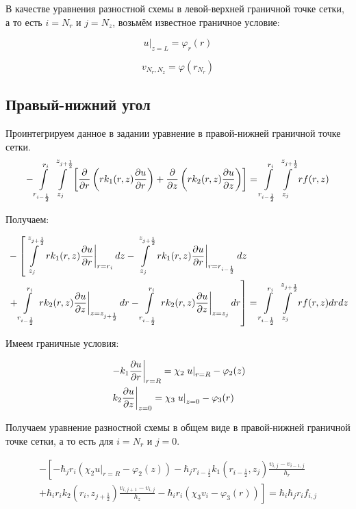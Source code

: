 В качестве уравнения разностной схемы в левой-верхней граничной точке сетки, 
а то есть $ i = N_r $ и $ j = N_z $, возьмём известное граничное условие:

\[
  \left . u \right \vert_{z=L} = \varphi_r(r) 
\]

\[
  v_{N_r,N_z} = \varphi(r_{N_r})
\]

\subsection{Правый-нижний угол}

Проинтегрируем данное в задании уравнение в правой-нижней граничной точке сетки.
\[
  - \int\limits^{r_{i }}_{r_{i -\frac{1}{2}}} \int\limits^{z_{j +\frac{1}{2}}}_{z_{j }} \left [ \pdv{}{r} \left ( r k_1(r, z) \pdv{u}{r} \right ) 
  + \pdv{}{z} \left ( rk_2(r, z)\pdv{u}{z} \right ) \right ] = \int\limits^{r_{i }}_{r_{i -\frac{1}{2}}} \int\limits^{z_{j +\frac{1}{2}}}_{z_{j }} rf(r, z)
\]

Получаем:

\begin{align*}
  &- \left [
   \int\limits^{z_{j +\frac{1}{2}}}_{z_{j }}  \left . r k_1(r, z) \pdv{u}{r} \right \vert_{r = r_i} dz
  - \int\limits^{z_{j +\frac{1}{2}}}_{z_{j }} \left . r k_1(r, z) \pdv{u}{r} \right \vert_{r = r_{i - \frac{1}{2}}} dz
  \right . \\
  &\left . + \int\limits^{r_{i}}_{r_{i-\frac{1}{2}}} \left . rk_2(r, z)\pdv{u}{z} \right \vert_{z = z_{j + \frac{1}{2}}} dr
  - \int\limits^{r_{i}}_{r_{i-\frac{1}{2}}} \left . rk_2(r, z)\pdv{u}{z} \right \vert_{z = z_{j}} dr
  \right ] = \int\limits^{r_{i }}_{r_{i -\frac{1}{2}}} \int\limits^{z_{j +\frac{1}{2}}}_{z_{j }} rf(r, z) dr dz
\end{align*}

Имеем граничные условия:

\begin{align*}
  &\left . -k_1 \pdv{u}{r} \right \vert_{r=R} = \chi_2 \left . u \right \vert_{r=R} - \varphi_2(z) \\
  &\left . k_2 \pdv{u}{z} \right \vert_{z=0} = \chi_3 \left . u \right \vert_{z=0} - \varphi_3(r) 
\end{align*}

Получаем уравнение разностной схемы в общем виде в правой-нижней граничной точке сетки, а то есть
для $ i = N_r $ и $ j = 0 $.

\begin{align*}
  - \left [ 
  -\hbar_j r_i (\chi_2 \left . u \right \vert_{r=R} - \varphi_2(z) )
  - \hbar_j r_{i-\frac{1}{2}} k_1(r_{i-\frac{1}{2}}, z_j) \frac{v_{i, j} - v_{i - 1, j}}{h_{r}}
  \right . \\
  \left .
  + \hbar_i r_{i} k_2(r_i, z_{j+\frac{1}{2}}) \frac{v_{i, j + 1} - v_{i, j}}{h_{z}}
  - \hbar_i r_i (\chi_3 v_i - \varphi_3(r))
  \right ]  = \hbar_i \hbar_j r_i f_{i, j}
\end{align*}

